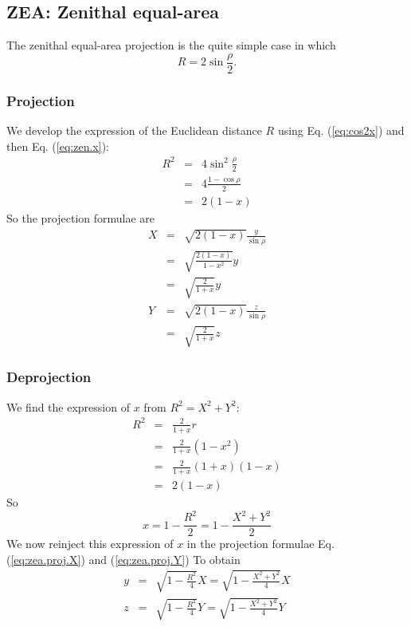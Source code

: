 \subsection{ZEA: Zenithal equal-area}

  The zenithal equal-area projection is the quite simple case in which
  \begin{equation}
    R = 2\sin\frac{\rho}{2}.
  \end{equation}

 \subsubsection{Projection}

  We develop the expression of the Euclidean distance $R$
  using Eq. (\ref{eq:cos2x}) and then Eq. (\ref{eq:zen.x}):
  \begin{eqnarray}
    R^2 & = & 4\sin^2\frac{\rho}{2} \\
        & = & 4\frac{1 - \cos\rho}{2} \\
        & = & 2(1 - x)
  \end{eqnarray}
  So the projection formulae are
  \begin{eqnarray}
    X & = & \sqrt{2(1 - x)} \frac{y}{\sin\rho} \\
      & = & \sqrt{\frac{2(1 - x)}{1 - x^2}} y \\
      & = & \sqrt{\frac{2}{1+x}}y \label{eq:zea.proj.X}\\
    Y & = & \sqrt{2(1 - x)} \frac{z}{\sin\rho} \\
      & = & \sqrt{\frac{2}{1+x}}z \label{eq:zea.proj.Y}
  \end{eqnarray}

  \subsubsection{Deprojection}

    We find the expression of $x$ from $R^2=X^2+Y^2$:
    \begin{eqnarray}
      R^2 & = & \frac{2}{1+x}r \\
          & = & \frac{2}{1+x}(1-x^2) \\
          & = & \frac{2}{1+x}(1+x)(1-x) \\
          & = & 2(1-x)
    \end{eqnarray}
    So
    \begin{equation}
      x = 1 - \frac{R^2}{2} = 1 - \frac{X^2+Y^2}{2}
    \end{equation}
    We now reinject this expression of $x$ in the projection formulae Eq. (\ref{eq:zea.proj.X}) and (\ref{eq:zea.proj.Y})
    To obtain 
    \begin{eqnarray}
      y & = & \sqrt{1-\frac{R^2}{4}}X = \sqrt{1-\frac{X^2+Y^2}{4}}X \\
      z & = & \sqrt{1-\frac{R^2}{4}}Y = \sqrt{1-\frac{X^2+Y^2}{4}}Y
    \end{eqnarray}
 

